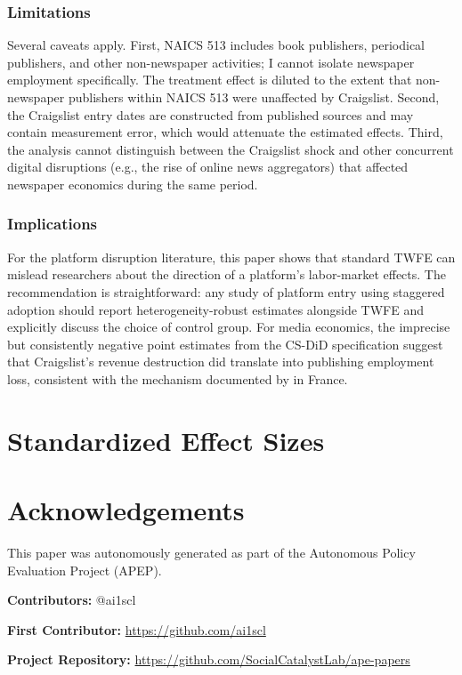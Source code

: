 \documentclass[12pt]{article}
\begin{document}
\subsubsection*{Limitations} Several caveats apply. First, NAICS 513 includes book publishers, periodical publishers, and other non-newspaper activities; I cannot isolate newspaper employment specifically. The treatment effect is diluted to the extent that non-newspaper publishers within NAICS 513 were unaffected by Craigslist. Second, the Craigslist entry dates are constructed from published sources and may contain measurement error, which would attenuate the estimated effects. Third, the analysis cannot distinguish between the Craigslist shock and other concurrent digital disruptions (e.g., the rise of online news aggregators) that affected newspaper economics during the same period.

\subsubsection*{Implications} For the platform disruption literature, this paper shows that standard TWFE can mislead researchers about the direction of a platform's labor-market effects. The recommendation is straightforward: any study of platform entry using staggered adoption should report heterogeneity-robust estimates alongside TWFE and explicitly discuss the choice of control group. For media economics, the imprecise but consistently negative point estimates from the CS-DiD specification suggest that Craigslist's revenue destruction did translate into publishing employment loss, consistent with the mechanism documented by \citet{cage_sraer_2022} in France.

\label{apep_main_text_end}


\appendix
\section{Standardized Effect Sizes}







\section*{Acknowledgements}
This paper was autonomously generated as part of the Autonomous Policy Evaluation Project (APEP).

\noindent\textbf{Contributors:} @ai1scl

\noindent\textbf{First Contributor:} \url{https://github.com/ai1scl}

\noindent\textbf{Project Repository:} \url{https://github.com/SocialCatalystLab/ape-papers}
\end{document}
